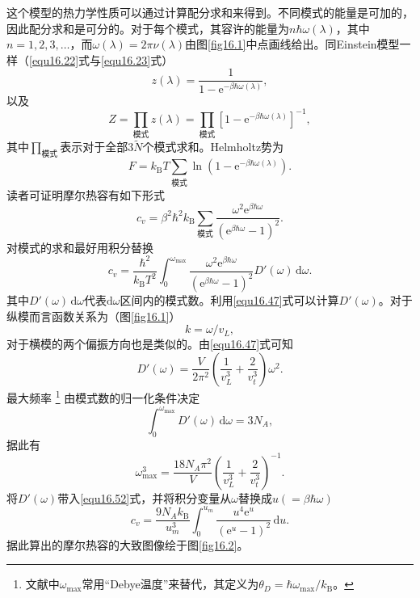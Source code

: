 这个模型的热力学性质可以通过计算配分求和来得到。不同模式的能量是可加的，因此配分求和是可分的。对于每个模式，其容许的能量为$n\hbar\omega(\lambda)$，其中$n=1,2,3,\dots$，而$\omega(\lambda)=2\pi\nu(\lambda)$由图\ref{fig16.1}中点画线给出。同Einstein模型一样（\eqref{equ16.22}式与\eqref{equ16.23}式）
\begin{equation}
z(\lambda)=\frac{1}{1-\mathrm e^{-\beta\hbar\omega(\lambda)}},
\label{equ16.48}
\end{equation}
以及
\begin{equation}
Z=\prod\limits_{\text{模式}}z(\lambda)=\prod\limits_{\text{模式}}\left[1-\mathrm e^{-\beta\hbar\omega(\lambda)}\right]^{-1},
\label{equ16.49}
\end{equation}
其中$\prod_{\text{模式}}$表示对于全部$3\tilde N$个模式求和。Helmholtz势为
\begin{equation}
F=k_\text{B}T\sum\limits_\text{模式}\ln(1-\mathrm e^{-\beta\hbar\omega(\lambda)}).
\end{equation}
读者可证明摩尔热容有如下形式
\begin{equation}
c_v = \beta^2\hbar^2k_\text{B}\sum\limits_\text{模式}\frac{\omega^2\mathrm e^{\beta\hbar\omega}}{(\mathrm e^{\beta\hbar\omega}-1)^2}.
\label{equ16.51}
\end{equation}
对模式的求和最好用积分替换
\begin{equation}
c_v = \frac{\hbar^2}{k_\text{B}T^2}\int_0^{\omega_{\max}}\frac{\omega^2\mathrm e^{\beta\hbar\omega}}{(\mathrm e^{\beta\hbar\omega}-1)^2}D'(\omega)\,\mathrm d\omega.
\label{equ16.52}
\end{equation}
其中$D'(\omega)\,\mathrm d\omega$代表$\mathrm d\omega$区间内的模式数。利用\eqref{equ16.47}式可以计算$D'(\omega)$。对于纵模而言函数关系为（图\ref{fig16.1}）
\begin{equation}
k=\omega/v_L,
\end{equation}
对于横模的两个偏振方向也是类似的。由\eqref{equ16.47}式可知
\begin{equation}
D'(\omega) = \frac{V}{2\pi^2}\left(\frac{1}{v_L^3}+\frac{2}{v_t^3}\right)\omega^2.
\end{equation}
最大频率%
\footnote{文献中$\omega_{\max}$常用``Debye温度''来替代，其定义为$\theta_D=\hbar\omega_{\max}/k_\text{B}$。}%
由模式数的归一化条件决定
\begin{equation}
\int_0^{\omega_{\max}}D'(\omega)\,\mathrm d\omega = 3N_A,
\end{equation}
据此有
\begin{equation}
\omega_{\max}^3 = \frac{18N_A\pi^2}{V}\left(\frac{1}{v_L^3}+\frac{2}{v_t^3}\right)^{-1}.
\end{equation}
将$D'(\omega)$带入\eqref{equ16.52}式，并将积分变量从$\omega$替换成$u(=\beta\hbar\omega)$
\begin{equation}
c_v=\frac{9N_Ak_\text{B}}{u_m^3}\int_0^{u_m}\frac{u^4\mathrm e^u}{(\mathrm e^u-1)^2}\,\mathrm du.
\label{equ16.57}
\end{equation}
据此算出的摩尔热容的大致图像绘于图\ref{fig16.2}。

